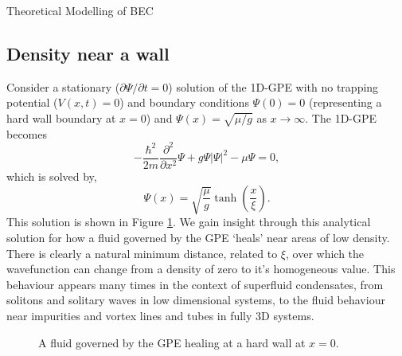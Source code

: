 \begin{chapter}{\label{cha:theoretical_model}Theoretical Modelling of BEC}
	\subsection{\label{section:wall} Density near a wall}
	Consider a stationary ($\partial \Psi / \partial t = 0$) solution of the 1D-GPE with no trapping potential ($V(x,t)=0$) and boundary conditions $\Psi(0)=0$ (representing a hard wall boundary at $x=0$) and $\Psi(x)=\sqrt{\mu/g}$ as $x\rightarrow\infty$. The 1D-GPE becomes
	\begin{equation}
		-\frac{\hbar^2 }{2m}\frac{\partial^2}{\partial x^2}\Psi + g\Psi|\Psi|^2 - \mu\Psi = 0,
	\end{equation}
	which is solved by,
	\begin{equation}
		\Psi(x) = \sqrt{\frac{\mu}{g}}\tanh \left( \frac{x}{\xi} \right).
	\end{equation}
	This solution is shown in Figure \ref{fig_wallsoln}. We gain insight through this analytical solution for how a fluid governed by the GPE `heals' near areas of low density. There is clearly a natural minimum distance, related to $\xi$, over which the wavefunction can change from a density of zero to it's homogeneous value. This behaviour appears many times in the context of superfluid condensates, from solitons and solitary waves in low dimensional systems, to the fluid behaviour near impurities and vortex lines and tubes in fully 3D systems. 
\begin{figure}
	\centering
  \caption{A fluid governed by the GPE healing at a hard wall at $x=0$.}\label{fig_wallsoln}
 \end{figure}


\end{chapter}
